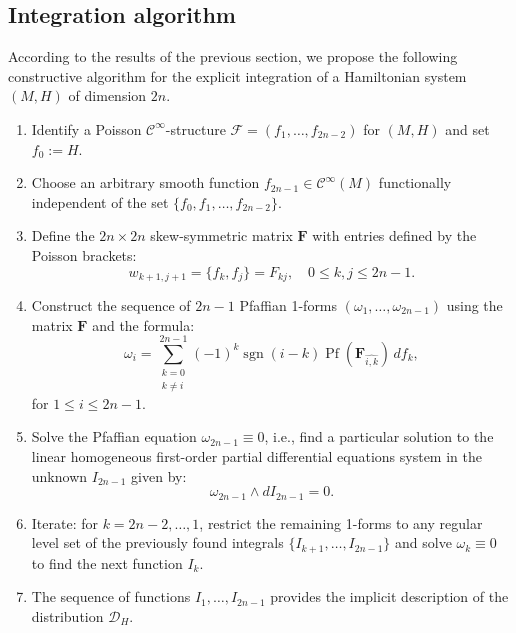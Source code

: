 \documentclass{article}
\theoremstyle{remark}
\theoremstyle{definition}
\begin{document}
\subsection{Integration algorithm}\label{sec:integration-algorithm}
According to the results of the previous section, we propose the following constructive algorithm for the explicit integration of a Hamiltonian system $(M, H)$ of dimension $2n$.
\begin{enumerate}[label=\textbf{Step \arabic*.}, leftmargin=*]
        
    \item Identify a Poisson $\mathcal{C}^{\infty}$-structure $\mathcal{F}=(f_{1}, \dots, f_{2n-2})$ for $(M,H)$ and set $f_0:=H$.
        
    \item Choose an arbitrary smooth function $f_{2n-1} \in \mathcal{C}^{\infty}(M)$ functionally independent of the set $\{f_0,f_1,\dots,f_{2n-2}\}$.
        
    \item Define the $2n \times 2n$ skew-symmetric matrix $\mathbf{F}$ with entries defined by the Poisson brackets:
        \begin{equation}
             w_{k+1,j+1}= \{f_k, f_j\}=F_{kj}, \quad 0 \le k, j \le 2n-1.
        \end{equation}
        
    \item Construct the sequence of $2n-1$ Pfaffian 1-forms $(\omega_1, \dots, \omega_{2n-1})$ using the matrix $\mathbf{F}$ and the formula:
        \begin{equation}\label{eq:omega_i_unified_repeated}
            \omega_i = \sum_{\substack{k=0 \\ k \neq i}}^{2n-1} (-1)^{k} \operatorname{sgn}(i-k) \operatorname{Pf}(\mathbf{F}_{\widehat{i,k}}) \, df_k, 
        \end{equation}
        for $1 \leq i \leq 2n-1$.

    \item Solve the Pfaffian equation $\omega_{2n-1} \equiv 0$, i.e., find a particular solution to the linear homogeneous first-order partial differential equations system in the unknown $I_{2n-1}$ given by:
        $$
        \omega_{2n-1} \wedge dI_{2n-1} = 0.
        $$
        
    
    \item Iterate: for $k = 2n-2, \dots, 1$, restrict the remaining 1-forms to any regular level set of the previously found integrals $\{I_{k+1}, \dots, I_{2n-1}\}$ and solve $\omega_{k} \equiv 0$ to find the next function $I_{k}$.
    
    \item The sequence of functions $I_1, \dots, I_{2n-1}$ provides the implicit description of the distribution $\mathcal{D}_H$.
\end{enumerate}
\end{document}
